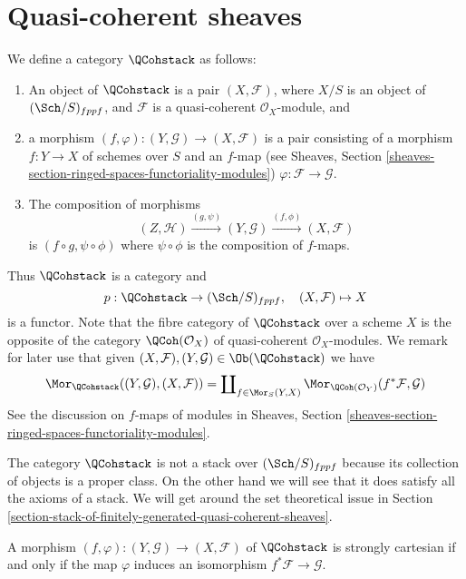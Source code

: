 \section{Quasi-coherent sheaves}
\label{section-stack-of-quasi-coherent-sheaves}

\noindent
We define a category $\QCohstack$ as follows:
\begin{enumerate}
\item An object of $\QCohstack$ is a pair $(X, \mathcal{F})$,
where $X/S$ is an object of $(\Sch/S)_{fppf}$, and $\mathcal{F}$
is a quasi-coherent $\mathcal{O}_X$-module, and
\item a morphism $(f, \varphi) : (Y, \mathcal{G}) \to (X, \mathcal{F})$
is a pair consisting of a morphism $f : Y \to X$ of schemes over $S$
and an $f$-map (see
Sheaves, Section \ref{sheaves-section-ringed-spaces-functoriality-modules})
$\varphi : \mathcal{F} \to \mathcal{G}$.
\item The composition of morphisms
$$
(Z, \mathcal{H}) \xrightarrow{(g, \psi)}
(Y, \mathcal{G}) \xrightarrow{(f, \phi)} (X, \mathcal{F})
$$
is $(f \circ g, \psi \circ \phi)$ where $\psi \circ \phi$ is
the composition of $f$-maps.
\end{enumerate}
Thus $\QCohstack$ is a category and
$$
p : \QCohstack \to (\Sch/S)_{fppf},
\quad
(X, \mathcal{F}) \mapsto X
$$
is a functor. Note that the fibre category of $\QCohstack$ over
a scheme $X$ is the opposite of the category $\QCoh(\mathcal{O}_X)$
of quasi-coherent $\mathcal{O}_X$-modules.
We remark for later use that given
$(X, \mathcal{F}), (Y, \mathcal{G}) \in \Ob(\QCohstack)$
we have
\begin{equation}
\label{equation-morphisms-qcoh}
\Mor_{\QCohstack}((Y, \mathcal{G}), (X, \mathcal{F}))
=
\coprod\nolimits_{f \in \Mor_S(Y, X)}
\Mor_{\QCoh(\mathcal{O}_Y)}(f^*\mathcal{F}, \mathcal{G})
\end{equation}
See the discussion on $f$-maps of modules in
Sheaves, Section \ref{sheaves-section-ringed-spaces-functoriality-modules}.

\medskip\noindent
The category $\QCohstack$ is not a stack over $(\Sch/S)_{fppf}$
because its collection of objects is a proper class. On the other hand
we will see that it does satisfy all the axioms of a stack. We will
get around the set theoretical issue in
Section \ref{section-stack-of-finitely-generated-quasi-coherent-sheaves}.

\begin{lemma}
\label{lemma-quasi-coherent-strongly-cartesian}
A morphism $(f, \varphi) : (Y, \mathcal{G}) \to (X, \mathcal{F})$
of $\QCohstack$ is strongly cartesian if and only if the
map $\varphi$ induces an isomorphism $f^*\mathcal{F} \to \mathcal{G}$.
\end{lemma}

